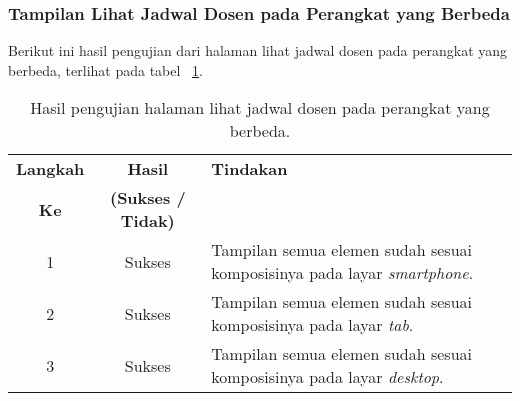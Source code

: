 \subsubsection{Tampilan Lihat Jadwal Dosen pada Perangkat yang Berbeda}
Berikut ini hasil pengujian dari halaman lihat jadwal dosen pada perangkat yang berbeda, terlihat pada tabel ~\ref{hasil:LihatJadwalDosenDevices}.
\begin{table}[H]
	\centering 
	\caption{Hasil pengujian halaman lihat jadwal dosen pada perangkat yang berbeda.}
	\label{hasil:LihatJadwalDosenDevices}
	\begin{tabular}{|c|c|p{}|}
		\toprule
		\textbf{Langkah} & \textbf{Hasil} & \textbf{Tindakan}\\
		\textbf{Ke} & \textbf{(Sukses / Tidak)} & \\		
		\midrule
		1 & Sukses & Tampilan semua elemen sudah sesuai komposisinya pada layar \textit{smartphone}.\\
		\hline
		2 & Sukses & Tampilan semua elemen sudah sesuai komposisinya pada layar \textit{tab}.\\
		\hline
		3 & Sukses & Tampilan semua elemen sudah sesuai komposisinya pada layar \textit{desktop}.\\
		\hline
		\bottomrule		
	\end{tabular} 
\end{table}

